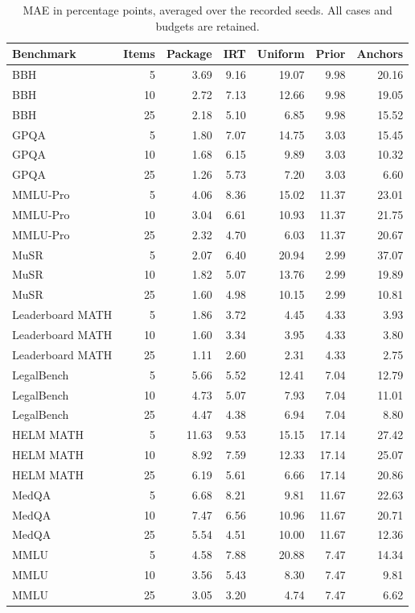 \documentclass{article}
\begin{document}
\begin{table}[ht]
\centering
\caption{MAE in percentage points, averaged over the recorded seeds. All cases and budgets are retained.}
\label{tab:cases}
\begin{tabular}{lrrrrrr}
\toprule
Benchmark & Items & Package & IRT & Uniform & Prior & Anchors\\
\midrule
BBH & 5 & 3.69 & 9.16 & 19.07 & 9.98 & 20.16 \\
BBH & 10 & 2.72 & 7.13 & 12.66 & 9.98 & 19.05 \\
BBH & 25 & 2.18 & 5.10 & 6.85 & 9.98 & 15.52 \\
GPQA & 5 & 1.80 & 7.07 & 14.75 & 3.03 & 15.45 \\
GPQA & 10 & 1.68 & 6.15 & 9.89 & 3.03 & 10.32 \\
GPQA & 25 & 1.26 & 5.73 & 7.20 & 3.03 & 6.60 \\
MMLU-Pro & 5 & 4.06 & 8.36 & 15.02 & 11.37 & 23.01 \\
MMLU-Pro & 10 & 3.04 & 6.61 & 10.93 & 11.37 & 21.75 \\
MMLU-Pro & 25 & 2.32 & 4.70 & 6.03 & 11.37 & 20.67 \\
MuSR & 5 & 2.07 & 6.40 & 20.94 & 2.99 & 37.07 \\
MuSR & 10 & 1.82 & 5.07 & 13.76 & 2.99 & 19.89 \\
MuSR & 25 & 1.60 & 4.98 & 10.15 & 2.99 & 10.81 \\
Leaderboard MATH & 5 & 1.86 & 3.72 & 4.45 & 4.33 & 3.93 \\
Leaderboard MATH & 10 & 1.60 & 3.34 & 3.95 & 4.33 & 3.80 \\
Leaderboard MATH & 25 & 1.11 & 2.60 & 2.31 & 4.33 & 2.75 \\
LegalBench & 5 & 5.66 & 5.52 & 12.41 & 7.04 & 12.79 \\
LegalBench & 10 & 4.73 & 5.07 & 7.93 & 7.04 & 11.01 \\
LegalBench & 25 & 4.47 & 4.38 & 6.94 & 7.04 & 8.80 \\
HELM MATH & 5 & 11.63 & 9.53 & 15.15 & 17.14 & 27.42 \\
HELM MATH & 10 & 8.92 & 7.59 & 12.33 & 17.14 & 25.07 \\
HELM MATH & 25 & 6.19 & 5.61 & 6.66 & 17.14 & 20.86 \\
MedQA & 5 & 6.68 & 8.21 & 9.81 & 11.67 & 22.63 \\
MedQA & 10 & 7.47 & 6.56 & 10.96 & 11.67 & 20.71 \\
MedQA & 25 & 5.54 & 4.51 & 10.00 & 11.67 & 12.36 \\
MMLU & 5 & 4.58 & 7.88 & 20.88 & 7.47 & 14.34 \\
MMLU & 10 & 3.56 & 5.43 & 8.30 & 7.47 & 9.81 \\
MMLU & 25 & 3.05 & 3.20 & 4.74 & 7.47 & 6.62 \\
\bottomrule
\end{tabular}
\end{table}
\end{document}
